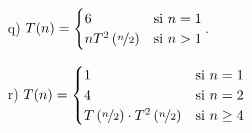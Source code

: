 \begin{ejercicio}
\begin{enumerate}[label=\alph*)]

        \item[q)] $T(n)=\begin{cases}
            6 & \text{si } n=1 \\
            nT^2\left(\nicefrac{n}{2}\right) & \text{si } n>1
        \end{cases}$.

        \item[r)] $T(n) = \begin{cases}
            1 & \text{si } n = 1 \\
            4 & \text{si } n = 2 \\
            T\left(\nicefrac{n}{2}\right) \cdot T^2\left(\nicefrac{n}{2}\right) & \text{si } n \geq 4
        \end{cases}$
    \end{enumerate}
\end{ejercicio}



